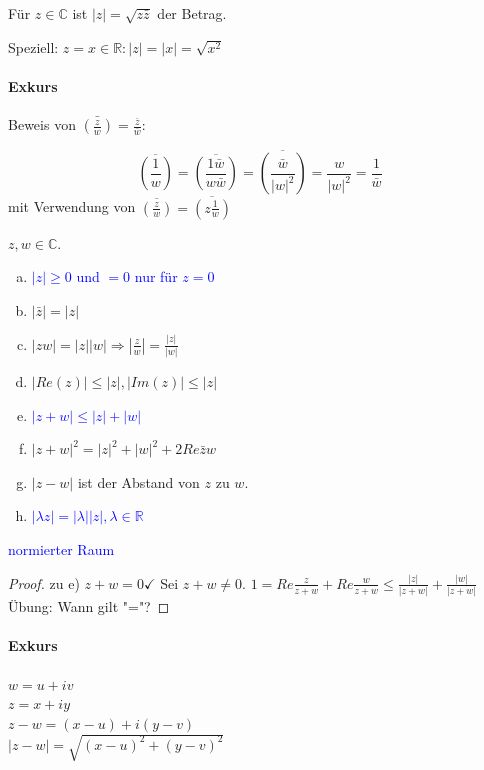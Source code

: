 \documentclass[a4paper,11pt,notitlepage]{report}
\theoremstyle{definition}
\newcommand{\R}{{\ensuremath{\mathbb{R}}}}
\newcommand{\C}{{\ensuremath{\mathbb{C}}}}
\newenvironment{definition}[1]{
	\begin{definitions}
	\marginnote{\emph{#1}}
}{\end{definitions}}
\begin{document}
\begin{definition}{Betrag}
Für $z \in \C$ ist $|z| = \sqrt{z \bar{z}}$ der Betrag.

Speziell: $z = x \in \R: |z| = |x| = \sqrt{x^2}$
\end{definition}

\paragraph{Exkurs}
Beweis von $\bar{(\frac{z}{w})} = \frac{\bar{z}}{\bar{w}}$:

$$\overline{\left(\frac{1}{w}\right)} = \overline{\left(\frac{1 \bar{w}}{w \bar{w}}\right)} = \overline{\left(\frac{\bar{w}}{|w|^2}\right)} = \frac{w}{|w|^2} = \frac{1}{\bar{w}}$$ mit Verwendung von $\overline{\left(\frac{z}{w}\right)} = \overline{\left(z \frac{1}{w}\right)}$

\begin{theorem}
	$z,w \in \C$.
	\begin{enumerate}[a)]
		\item \textcolor{blue}{$|z| \geq 0$ und $= 0$ nur für $z = 0$}
		\item $|\bar{z}| = |z|$
		\item $|zw| = |z||w| \Rightarrow |\frac{z}{w}|= \frac{|z|}{|w|}$
		\item $|Re(z)| \leq |z|, |Im(z)| \leq |z|$
		\item \textcolor{blue}{$|z+w| \leq |z| + |w|$}
		\item $|z+w|^2 = |z|^2 + |w|^2 + 2 Re \bar{z} w$
		\item $|z-w|$ ist der Abstand von $z$ zu $w$.
		\item \textcolor{blue}{$|\lambda z| = |\lambda| |z|, \lambda \in \R$}
	\end{enumerate}
	\textcolor{blue}{normierter Raum}
\end{theorem}

\begin{proof}
	zu e) $z + w = 0 \checkmark$
	Sei $z+w \neq 0.$
	$1 = Re \frac{z}{z+w} + Re \frac{w}{z+w} \leq \frac{|z|}{|z+w|} + \frac{|w|}{|z+w|}$ \newline Übung: Wann gilt "="?
\end{proof}

\paragraph{Exkurs}
$w = u+iv$\\
$z = x+iy$\\
$z-w = (x-u) + i(y-v)$\\
$|z-w| = \sqrt{(x-u)^2 + (y-v)^2}$
\end{document}
